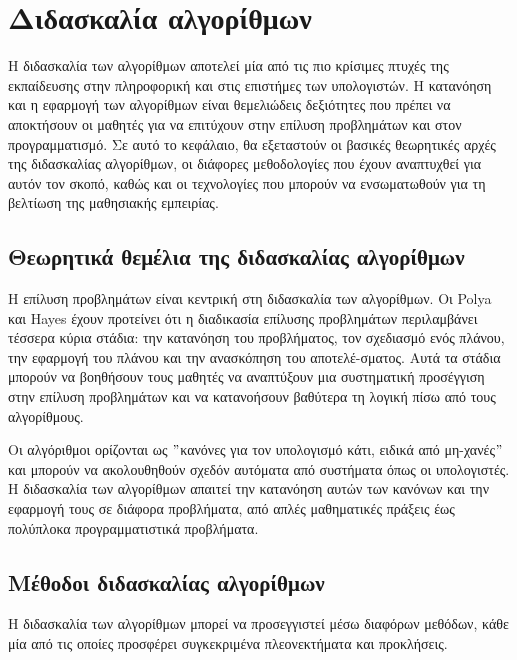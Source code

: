 \hideheader
\section{Διδασκαλία αλγορίθμων}

Η διδασκαλία των αλγορίθμων αποτελεί μία από τις πιο κρίσιμες πτυχές της εκπαίδευσης στην πληροφορική και στις επιστήμες των υπολογιστών. Η κατανόηση και η εφαρμογή των αλγορίθμων είναι θεμελιώδεις δεξιότητες που πρέπει να αποκτήσουν οι μαθητές για να επιτύχουν στην επίλυση προβλημάτων και στον προγραμματισμό. Σε αυτό το κεφάλαιο, θα εξεταστούν οι βασικές θεωρητικές αρχές της διδασκαλίας αλγορίθμων, οι διάφορες μεθοδολογίες που έχουν αναπτυχθεί για αυτόν τον σκοπό, καθώς και οι τεχνολογίες που μπορούν να ενσωματωθούν για τη βελτίωση της μαθησιακής εμπειρίας.

\subsection{Θεωρητικά θεμέλια της διδασκαλίας αλγορίθμων}

Η επίλυση προβλημάτων είναι κεντρική στη διδασκαλία των αλγορίθμων. Οι Polya και Hayes έχουν προτείνει ότι η διαδικασία επίλυσης προβλημάτων περιλαμβάνει τέσσερα κύρια στάδια: την κατανόηση του προβλήματος, τον σχεδιασμό ενός πλάνου, την εφαρμογή του πλάνου και την ανασκόπηση του αποτελέ-σματος\cite{bodner_role_1987,crepinsek_note_2012}. Αυτά τα στάδια μπορούν να βοηθήσουν τους μαθητές να αναπτύξουν μια συστηματική προσέγγιση στην επίλυση προβλημάτων και να κατανοήσουν βαθύτερα τη λογική πίσω από τους αλγορίθμους.

Οι αλγόριθμοι ορίζονται ως \("\)κανόνες για τον υπολογισμό κάτι, ειδικά από μη-χανές\("\) και μπορούν να ακολουθηθούν σχεδόν αυτόματα από συστήματα όπως οι υπολογιστές\cite{bodner_role_1987}. Η διδασκαλία των αλγορίθμων απαιτεί την κατανόηση αυτών των κανόνων και την εφαρμογή τους σε διάφορα προβλήματα, από απλές μαθηματικές πράξεις έως πολύπλοκα προγραμματιστικά προβλήματα.


\subsection{Μέθοδοι διδασκαλίας αλγορίθμων}

Η διδασκαλία των αλγορίθμων μπορεί να προσεγγιστεί μέσω διαφόρων μεθόδων, κάθε μία από τις οποίες προσφέρει συγκεκριμένα πλεονεκτήματα και προκλήσεις.

